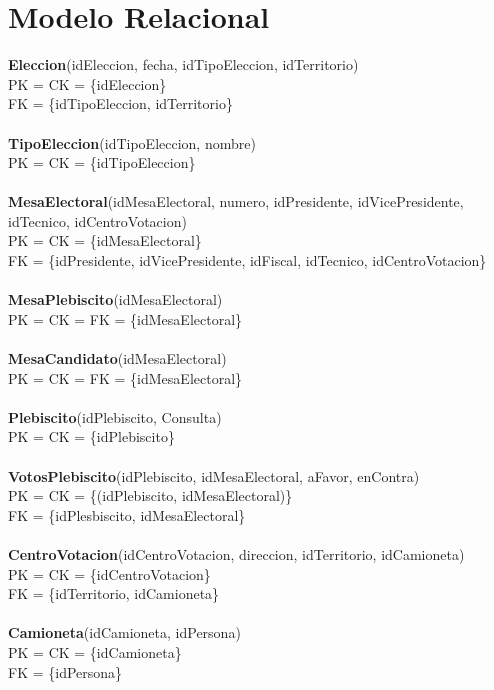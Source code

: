 \section{Modelo Relacional}

\textbf{Eleccion}(idEleccion, fecha, idTipoEleccion, idTerritorio)\\
  PK = CK = \{idEleccion\}\\
  FK = \{idTipoEleccion, idTerritorio\}\\
\\
\textbf{TipoEleccion}(idTipoEleccion, nombre)\\
  PK = CK = \{idTipoEleccion\}\\
\\
\textbf{MesaElectoral}(idMesaElectoral, numero, idPresidente, idVicePresidente, idTecnico, idCentroVotacion)\\
  PK = CK = \{idMesaElectoral\}\\
  FK = \{idPresidente, idVicePresidente, idFiscal, idTecnico, idCentroVotacion\}\\
\\
\textbf{MesaPlebiscito}(idMesaElectoral)\\
  PK = CK = FK = \{idMesaElectoral\}\\
\\
\textbf{MesaCandidato}(idMesaElectoral)\\
  PK = CK = FK = \{idMesaElectoral\}\\
\\
\textbf{Plebiscito}(idPlebiscito, Consulta)\\
  PK = CK = \{idPlebiscito\}\\
\\
\textbf{VotosPlebiscito}(idPlebiscito, idMesaElectoral, aFavor, enContra)\\
  PK = CK = \{(idPlebiscito, idMesaElectoral)\}\\
  FK = \{idPlesbiscito, idMesaElectoral\}\\
\\
\textbf{CentroVotacion}(idCentroVotacion, direccion, idTerritorio, idCamioneta)\\
  PK = CK = \{idCentroVotacion\}\\
  FK = \{idTerritorio, idCamioneta\}\\
\\
\textbf{Camioneta}(idCamioneta, idPersona)\\
  PK = CK = \{idCamioneta\}\\
  FK = \{idPersona\}\\
